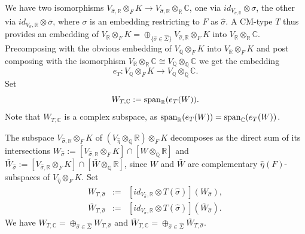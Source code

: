 \documentclass[12pt]{amsart}
\numberwithin{equation}{subsection}
\theoremstyle{plain}
\theoremstyle{definition}
\newcommand{\CC}{{\mathbb C}}
\newcommand{\QQ}{{\mathbb Q}}
\newcommand{\RR}{{\mathbb R}}
\newcommand{\End}{{\rm End}}
\renewcommand{\span}{{\rm span}}
\begin{document}
{We have two isomorphisms $V_{\hat{\sigma},\RR}\otimes_FK\rightarrow V_{\hat{\sigma},\RR}\otimes_\RR\CC$, one via $id_{V_{\hat{\sigma},\RR}}\otimes\sigma$, the other via $id_{V_{\hat{\sigma}},\RR}\otimes\bar{\sigma}$, where $\sigma$ is an embedding restricting to $F$ as $\hat{\sigma}$. 
A CM-type $T$ thus provides an embedding of $V_\RR\otimes_FK=\oplus_{\{\hat{\sigma}\in\hat{\Sigma}\}}V_{\hat{\sigma},\RR}\otimes_FK$ into $V_\RR\otimes_\RR\CC$. Precomposing with the obvious embedding of $V_\QQ\otimes_FK$ into $V_\RR\otimes_FK$ and post composing with the isomorphism $V_\RR\otimes_\RR\CC\cong V_\QQ\otimes_\QQ\CC$ we get the embedding
\begin{equation}
\label{eq-embedding-of-V-otimes-FK-in-V-CC}
e_T:V_\QQ\otimes_F K\rightarrow V_\QQ\otimes_\QQ \CC.
\end{equation}
Set
\begin{equation}
\label{eq-W-T}
W_{T,\CC}:=\span_\RR(e_T(W)).
\end{equation}
Note that $W_{T,\CC}$ is a complex subspace, as $\span_\RR(e_T(W))=\span_\CC(e_T(W))$.

The subspace 
$V_{\hat{\sigma},\RR}\otimes_FK$ of $(V_{\hat{\eta}}\otimes_\QQ\RR)\otimes_F K$ decomposes as the direct sum of its intersections 
$W_{\hat{\sigma}}:=[V_{\hat{\sigma},\RR}\otimes_FK]\cap[W\otimes_\QQ\RR]$ and 
$\bar{W}_{\hat{\sigma}}:=[V_{\hat{\sigma},\RR}\otimes_FK]\cap[\bar{W}\otimes_\QQ\RR]$, since $W$ and $\bar{W}$ are complementary $\hat{\eta}(F)$-subspaces of $V_{\hat{\eta}}\otimes_F K$.
Set
\begin{eqnarray}
\label{W-T-hat-sigma}
W_{T,\hat{\sigma}}&:=&[id_{V_{\hat{\sigma}},\RR}\otimes T(\hat{\sigma})](W_{\hat{\sigma}}),
\\
\nonumber
\bar{W}_{T,\hat{\sigma}}&:=&[id_{V_{\hat{\sigma}},\RR}\otimes T(\hat{\sigma})](\bar{W}_{\hat{\sigma}}).
\end{eqnarray}
 We have $W_{T,\CC}=\oplus_{\hat{\sigma}\in\hat{\Sigma}}W_{T,\hat{\sigma}}$ and
 $\bar{W}_{T,\CC}=\oplus_{\hat{\sigma}\in\hat{\Sigma}}\bar{W}_{T,\hat{\sigma}}$.
 
}
\end{document}
